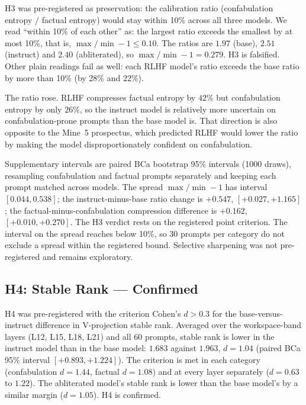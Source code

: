 \documentclass[11pt,a4paper]{article}
\begin{document}
H3 was pre-registered as preservation: the calibration ratio
(confabulation entropy / factual entropy) would stay within 10\% across
all three models. We read ``within 10\% of each other'' as: the largest
ratio exceeds the smallest by at most 10\%, that is,
$\max/\min - 1 \le 0.10$. The ratios are $1.97$ (base), $2.51$
(instruct) and $2.40$ (abliterated), so $\max/\min - 1 = 0.279$. H3 is
falsified. Other plain readings fail as well: each RLHF model's ratio
exceeds the base ratio by more than 10\% (by 28\% and 22\%).

The ratio rose. RLHF compresses factual entropy by $42\%$ but
confabulation entropy by only $26\%$, so the instruct model is
relatively more uncertain on confabulation-prone prompts than the base
model is. That direction is also opposite to the Mine~5 prospectus,
which predicted RLHF would lower the ratio by making the model
disproportionately confident on confabulation.

Supplementary intervals are paired BCa bootstrap 95\% intervals (1000
draws), resampling confabulation and factual prompts separately and
keeping each prompt matched across models. The spread
$\max/\min - 1$ has interval $[0.044, 0.538]$; the instruct-minus-base
ratio change is $+0.547$, $[+0.027, +1.165]$; the
factual-minus-confabulation compression difference is $+0.162$,
$[+0.010, +0.270]$. The H3 verdict rests on the registered point
criterion. The interval on the spread reaches below 10\%, so 30 prompts
per category do not exclude a spread within the registered bound.
Selective sharpening was not pre-registered and remains exploratory.

\subsection{H4: Stable Rank --- Confirmed}

H4 was pre-registered with the criterion Cohen's $d > 0.3$ for the
base-versus-instruct difference in V-projection stable rank. Averaged
over the workspace-band layers (L12, L15, L18, L21) and all 60 prompts,
stable rank is lower in the instruct model than in the base model:
$1.683$ against $1.963$, $d = 1.04$ (paired BCa 95\% interval
$[+0.893, +1.224]$). The criterion is met in each category
(confabulation $d = 1.44$, factual $d = 1.08$) and at every layer
separately ($d = 0.63$ to $1.22$). The abliterated model's stable rank
is lower than the base model's by a similar margin ($d = 1.05$). H4 is
confirmed.

\end{document}
